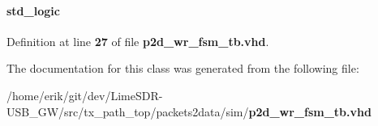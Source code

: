 \paragraph[{reset\+\_\+n}]{ {\bfseries \textcolor{comment}{std\+\_\+logic}\textcolor{vhdlchar}{ }} \hspace{0.3cm}{\ttfamily [Signal]}}\label{classp2d__wr__fsm__tb_1_1tb__behave_a1f070fd63a3a7fa45c907335ea870c5b}


Definition at line {\bf 27} of file {\bf p2d\+\_\+wr\+\_\+fsm\+\_\+tb.\+vhd}.



The documentation for this class was generated from the following file\+:\begin{DoxyCompactItemize}
\item 
/home/erik/git/dev/\+Lime\+S\+D\+R-\/\+U\+S\+B\+\_\+\+G\+W/src/tx\+\_\+path\+\_\+top/packets2data/sim/{\bf p2d\+\_\+wr\+\_\+fsm\+\_\+tb.\+vhd}\end{DoxyCompactItemize}
